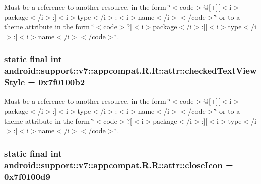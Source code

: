 Must be a reference to another resource, in the form \char`\"{}$<$code$>$@\mbox{[}+\mbox{]}\mbox{[}$<$i$>$package$<$/i$>$:\mbox{]}$<$i$>$type$<$/i$>$:$<$i$>$name$<$/i$>$$<$/code$>$\char`\"{} or to a theme attribute in the form \char`\"{}$<$code$>$?\mbox{[}$<$i$>$package$<$/i$>$:\mbox{]}\mbox{[}$<$i$>$type$<$/i$>$:\mbox{]}$<$i$>$name$<$/i$>$$<$/code$>$\char`\"{}. \hypertarget{classandroid_1_1support_1_1v7_1_1appcompat_1_1_r_1_1attr_785c05c29642c0fc9227c8a52b2427b5}{
\subsubsection[{checkedTextViewStyle}]{\setlength{\rightskip}{0pt plus 5cm}static final int android::support::v7::appcompat.R.R::attr::checkedTextViewStyle = 0x7f0100b2}}
\label{classandroid_1_1support_1_1v7_1_1appcompat_1_1_r_1_1attr_785c05c29642c0fc9227c8a52b2427b5}


Must be a reference to another resource, in the form \char`\"{}$<$code$>$@\mbox{[}+\mbox{]}\mbox{[}$<$i$>$package$<$/i$>$:\mbox{]}$<$i$>$type$<$/i$>$:$<$i$>$name$<$/i$>$$<$/code$>$\char`\"{} or to a theme attribute in the form \char`\"{}$<$code$>$?\mbox{[}$<$i$>$package$<$/i$>$:\mbox{]}\mbox{[}$<$i$>$type$<$/i$>$:\mbox{]}$<$i$>$name$<$/i$>$$<$/code$>$\char`\"{}. \hypertarget{classandroid_1_1support_1_1v7_1_1appcompat_1_1_r_1_1attr_8aad766b7e82de0ca00a8c7ab5159ec4}{
\subsubsection[{closeIcon}]{\setlength{\rightskip}{0pt plus 5cm}static final int android::support::v7::appcompat.R.R::attr::closeIcon = 0x7f0100d9}}
\label{classandroid_1_1support_1_1v7_1_1appcompat_1_1_r_1_1attr_8aad766b7e82de0ca00a8c7ab5159ec4}


